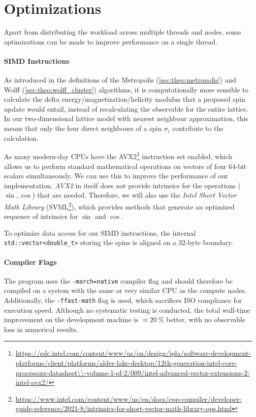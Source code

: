 \section{Optimizations}\label{sec:impl:optimizations}
	Apart from distributing the workload across multiple threads and nodes, some optimizations can be made to improve performance on a single thread.
	
	\paragraph{SIMD Instructions}\label{sec:impl:optimizations:simd}
		As introduced in the definitions of the Metropolis (\cref{sec:theo:metropolis}) and Wolff (\cref{sec:theo:wolff_cluster}) algorithms, it is computationally more sensible to calculate the delta energy/magnetization/helicity modulus that a proposed spin update would entail, instead of recalculating the observable for the entire lattice. In our two-dimensional lattice model with nearest neighbour approximation, this means that only the four direct neighbours of a spin $\sigma_i$ contribute to the calculation.
			
		As many modern-day CPUs have the AVX2\footnote{\url{https://edc.intel.com/content/www/us/en/design/ipla/software-development-platforms/client/platforms/alder-lake-desktop/12th-generation-intel-core-processors-datasheet\\-volume-1-of-2/009/intel-advanced-vector-extensions-2-intel-avx2/}} instruction set enabled, which allows us to perform standard mathematical operations on vectors of four $64$-bit scalars simultaneously. We can use this to improve the performance of our implementation. \emph{AVX2} in itself does not provide intrinsics for the operations ($\sin, \cos$) that are needed. Therefore, we will also use the \emph{Intel\textsuperscript{\tiny\textregistered} Short Vector Math Library} (SVML\footnote{\url{https://www.intel.com/content/www/us/en/docs/cpp-compiler/developer-guide-reference/2021-8/intrinsics-for-short-vector-math-library-ops.html}}), which provides methods that generate an optimized sequence of intrinsics for $\sin$ and $\cos$.
		
		To optimize data access for our SIMD instructions, the internal \texttt{std::vector<double_t>} storing the spins is aligned on a $32$-byte boundary.
		
	\paragraph{Compiler Flags}
		The program uses the \texttt{-march=native} compiler flag and should therefore be compiled on a system with the same or very similar CPU as the compute nodes. Additionally, the \texttt{-ffast-math} flag is used, which sacrifices ISO compliance for execution speed. Although no systematic testing is conducted, the total wall-time improvement on the development machine is $\approx \SI{20}{\percent}$ better, with no observable loss in numerical results. 
	
